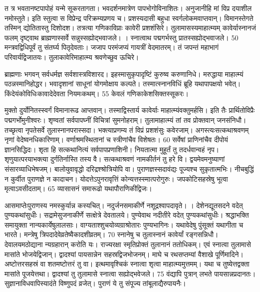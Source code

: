 त
त्र
भवतानष्टपापोहं यन्मे सूकरतागता।
 भवदर्शनमात्रेण पापभोगोविनाशितः।
 अनुजानीहि मां विप्र दयाशील नमोस्तुते।
 इति स्तुत्वा स विप्रेन्द्र परिक्रम्यप्रणय च।
 प्रशस्यदासी बहुधा स्वर्गलोकमवाप्तवान्।
 विमानस्तेगते तस्मिन् द्योतितास्तु दिशोदश।
 तत्रत्या गणिकाविप्राः कावेरी प्रशशंसिरे।
 तुलामासस्यमाहात्म्यम् कावेर्यास्नानजं फलम् दृष्ट्वाथ ब्राह्मणास्सर्वे सन्नुस्सह्योद्भवाजले।
 ।
 स्नात्वाथ पद्मगर्भस्तु प्रातस्सह्योद्भवाजले।
 50 मन्त्रवद्विधिपूर्वं तु संतर्घ्य पितृदेवताः।
 जजाप परमंजप्यं गायत्रीं वेदमातरम्।
 तं जपन्तं महाभागं परिवार्यद्विजातयः।
 तुलाकावेरिमाहात्म्य श्रवणेच्छुव ऊचिरे।
 
ब्राह्मणाः
भगवन् सर्वधर्मज्ञ सर्वशास्त्रविशारद।
 इहस्मासुकृपादृष्टिं कुरुष्व करुणानिधे।
 मरुद्धाया माहात्म्यं पठन्नस्मानिहोद्धर।
 भवादृशानां साधूनां योगमोक्षाय कल्पते।
 तस्मात्स्नानविधिं ब्रूहि यथापापक्षयो भवेत्।
 किंदेयंकोविधिःकावादेदेवता नियमःकथम्।
 55 केवलं गणिकाकेशसिक्तस्सूकरः।
 
मुक्तो दुर्योनितस्स्वर्गं विमानारूढ आप्तवान्।
 तस्माद्विस्तार्य कावेर्याः माहात्म्यंवक्तुमर्हसि।
 इति तैः प्रार्थितोविप्रैः पद्मगर्भोमुनीश्वरः।
 शृण्वतां सर्वपापघ्नीं विचित्रां सुमनोहराम्।
 तुलामाहात्म्यं तां तव प्रोक्तवान् जनसंनिधौ।
 तच्छृत्वा नृपतेसर्वे तुलास्नानपरास्सदा।
 भक्त्याप्रणम्य तं विप्रं प्रशशंसुः कवेरजाम्।
 अगस्त्यःसत्कथाश्रवणम् नृणां वेदेष्वनधिकारिणाम्।
 वर्णाश्रमस्थितानां च स्त्रीणांचैव विशेषतः।
 60 सर्वेषां प्राणिनांचैव दीपोयं ज्ञानसिद्धिदः।
 शृता हि सत्कथानित्यं सर्वपापप्रणाशिनी।
 नियतात्मा मुहूर्तं तु तदर्धवान्वहं नृप।
 शृणुयात्परयाभक्त्या दुर्गतिर्नास्ति तस्य वै।
 सत्कथाश्रवणं नामकीर्तनं तु हरे वि।
 द्वयमेवमनुष्याणां संसारव्याधिभेषजम्।
 बालोयुवावृद्धो दरिद्रश्श्रोत्रियोपि वा।
 पुराणज्ञस्सदावंद्यः पूज्यश्च सुकृतात्मभिः।
 नीचबुद्धिं न कुर्वीत पुराणज्ञे न कादाचन।
 योदत्तेऽपुनरावृत्तिं कोन्यत्तस्स्मात्परोगुरुः।
 जपकोटिसहस्रेषु भूत्वा मृत्वाऽवसीदताम्।
 65 व्यासासनं समारूढो यथापौराणिकीद्विजः।

आसमाप्तेःपुराणस्य नमस्कुर्यान्न कस्यचित्।
 नदुर्जनसमाकीर्णे नशूद्रश्वापदावृते।
 ।
 देशेनद्यूतसदने वदेत् पुण्यकथांसुधीः।
 सद्रामेसुजनाकीर्णे सत्क्षेत्रे देवतालये।
 पुण्येवाथ नदीतीरे वदेत् पुण्यकथांसुधीः।
 श्रद्धाभक्ति समायुक्ता नान्यकार्येषुलालसाः।
 वाग्यताश्शुचयोव्यग्राश्रोतारः पुण्यभागिनः।
 यथावेदेषु पुंसूक्तं यथागीता च भारते।
 मन्त्रेषु त्रिपदादेवेव्रतेष्वैकादशीव्रतम्।
 70 स्नानेषु च तुलास्नानं कावेर्यां रङ्गसन्निधौ।
 देवालयमठोद्याना न्यग्रहारान् करोति यः।
 राज्यरक्षा स्मृतिप्रोक्तं तुलानानं ततोधिकम्।
 एवं स्नात्वा तुलामासे मासांते भोजयेद्विजान्।
 द्वादश्यां पायसान्नेन सहस्रद्विजभोजनम्।
 माघे च रथसप्तम्यां वैशाखे पूर्णिमादिने।
 अष्टोत्तरसहस्रं वा शतमष्टोत्तरं तु वा।
 इत्थमावृश्चिकं स्नात्वा शृत्वा माहात्म्यमुत्तमम्।
 यथा च तुष्येत्तद्वक्ता मासांते पूजयेत्तथा।
 द्वादश्यां तु तुलामासे स्नात्वा सह्योद्भवेजले।
 75 वंद्यापि पुत्रान् लभते पायसान्नप्रदानतः।
 सुज्ञानाविधवापिस्यादंते विष्णुपदं व्रजेत्।
 पुराणं ये तु संपूज्य तांबूलाद्यैरुपायनैः।
 
